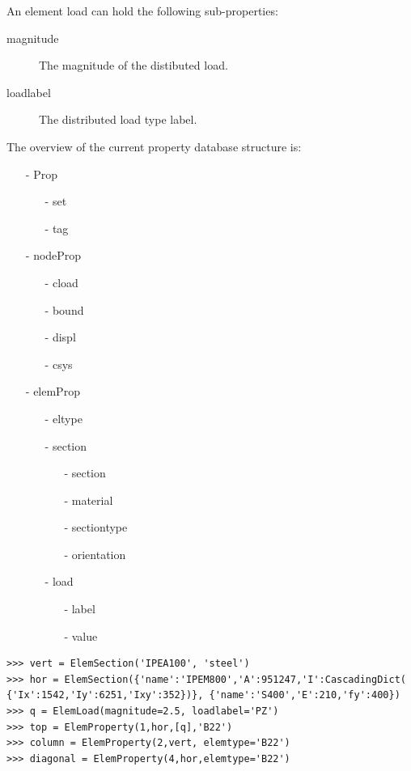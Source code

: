 {{{An element load can hold the following sub-properties:
\begin{description}
\item [magnitude] The magnitude of the distibuted load.
\item [loadlabel] The distributed load type label.
\end{description}

The overview of the current property database structure is:
\begin{itemize}
\item[-] Prop
    \begin{itemize}
    \item[-] set
    \item[-] tag
    \end{itemize}
\item[-] nodeProp
    \begin{itemize}
    \item[-] cload
    \item[-] bound
    \item[-] displ
    \item[-] csys
    \end{itemize}
\item[-] elemProp 
    \begin{itemize}
    \item[-] eltype
    \item[-] section
        \begin{itemize}
        \item[-] section
        \item[-] material
        \item[-] sectiontype
        \item[-] orientation
        \end{itemize}
    \item[-] load
        \begin{itemize}
        \item[-] label
        \item[-] value
        \end{itemize}
    \end{itemize}
\end{itemize}

\begin{verbatim}
>>> vert = ElemSection('IPEA100', 'steel')
>>> hor = ElemSection({'name':'IPEM800','A':951247,'I':CascadingDict(
{'Ix':1542,'Iy':6251,'Ixy':352})}, {'name':'S400','E':210,'fy':400})
>>> q = ElemLoad(magnitude=2.5, loadlabel='PZ')
>>> top = ElemProperty(1,hor,[q],'B22')
>>> column = ElemProperty(2,vert, elemtype='B22')
>>> diagonal = ElemProperty(4,hor,elemtype='B22')


\end{verbatim}}}}
